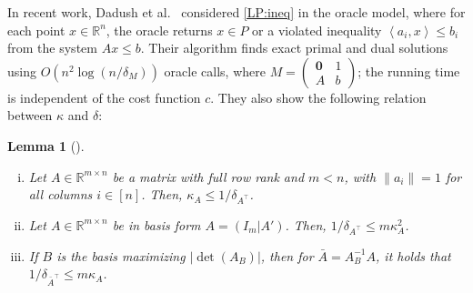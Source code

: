 \documentclass[11pt, a4paper]{article}
\newcommand{\pr}[2]{\left\langle #1, #2 \right\rangle}
\newcommand{\1}{\mathbbm{1}}
\newtheorem{lemma}[theorem]{Lemma}
\theoremstyle{case}
\newcommand{\R}{\mathbb{R}}
\begin{document}
 In recent work, Dadush et al.~\cite{Dadush-oracle} considered \eqref{LP:ineq} in the oracle model, where for each point $x\in \R^n$, the oracle returns $x\in P$ or a violated inequality $\pr{a_i}{x}\le b_i$ from the system $Ax\le b$. Their algorithm finds exact primal and dual solutions using $O(n^2\log(n/\delta_M))$ oracle calls, where 
 $M=\begin{pmatrix}\mathbf{0}& 1\\
A & b
\end{pmatrix}$; the running time is independent of the cost function $c$. They also show the following relation between $\kappa$ and $\delta$:

\begin{lemma}[{\cite{Dadush-oracle}}]\label{lem:delta-kappa}
\begin{enumerate}[(i)]
\item \label{i:delta-kappa-part-i} Let $A\in\R^{m\times n}$ be a matrix with full row rank and $m<n$, 
with $\|a_i\|=1$ for all columns $i\in[n]$. Then, $\kappa_A\le{1}/{\delta_{A^\top}}$. 
\item \label{i:delta-kappa-part-ii}Let $A\in\R^{m\times n}$ be in basis form  $A=(I_m|A')$. Then,
${1}/{\delta_{A^\top}}\le m\kappa_A^2$.
\item\label{i:m-kappa} If $B$ is the basis maximizing $|\det(A_B)|$, then  for $\bar A=A_B^{-1}A$, it holds that ${1}/{\delta_{\bar A^\top}}\le m\kappa_A$.
\end{enumerate}
\end{lemma}
\end{document}

